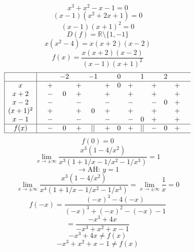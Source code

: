 \documentclass{article}
\begin{document}
\[ x^3 + x^2 - x - 1 = 0 \]
\[ (x-1)(x^2+2x+1) = 0 \]
\[ (x-1)(x+1)^2 = 0 \]
\[ D(f) = \mathbb{R} \setminus \{1, -1\} \]
\[ x(x^2-4) = x(x+2)(x-2) \]
\[ f(x) = \frac{x(x+2)(x-2)}{(x-1)(x+1)^2} \]
\[
\begin{array}{|c|ccccccccccccccc|}
\hline
 & & & -2 & & -1 & & 0 & & 1 & & 2 &  \\
\hline
x & & + & & + & & + & 0 & + & & + & & + &  \\
x+2 & & - & 0 & + & & + & & + & & + & & + &  \\
x-2 & & - & & - & & - & & - & & - & 0 & + &  \\
(x+1)^2 & & + & & + & 0 & + & & + & & + & & + &  \\
x-1 & & - & & - & & - & & - & 0 & + & & + &  \\
\hline
f(x) & & - & 0 & + & || & + & 0 & + & || & - & 0 & + &  \\
\hline
\end{array}
\]
\[ f(0) = 0 \]
\[ \lim_{x \to \pm\infty} \frac{x^3(1-4/x^2)}{x^3(1+1/x-1/x^2-1/x^3)} = 1 \]
\[ \to \text{AH: } y=1 \]
\[ \lim_{x \to \pm\infty} \frac{x^3(1-4/x^2)}{x^4(1+1/x-1/x^2-1/x^3)} = \lim_{x \to \pm\infty} \frac{1}{x} = 0 \]
\[ f(-x) = \frac{(-x)^3-4(-x)}{(-x)^3+(-x)^2-(-x)-1} \]
\[ = \frac{-x^3+4x}{-x^3+x^2+x-1} \]
\[ -x^3+4x \neq f(x) \]
\[ -x^3+x^2+x-1 \neq f(x) \]
\end{document}
